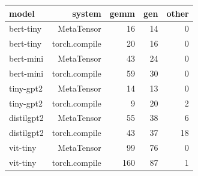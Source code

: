 \begin{tabular}{lrrrr}
\toprule
model & system & gemm & gen & other \\
\midrule
bert-tiny & MetaTensor & 16 & 14 & 0 \\
bert-tiny & torch.compile & 20 & 16 & 0 \\
bert-mini & MetaTensor & 43 & 24 & 0 \\
bert-mini & torch.compile & 59 & 30 & 0 \\
tiny-gpt2 & MetaTensor & 14 & 13 & 0 \\
tiny-gpt2 & torch.compile & 9 & 20 & 2 \\
distilgpt2 & MetaTensor & 55 & 38 & 6 \\
distilgpt2 & torch.compile & 43 & 37 & 18 \\
vit-tiny & MetaTensor & 99 & 76 & 0 \\
vit-tiny & torch.compile & 160 & 87 & 1 \\
\bottomrule
\end{tabular}
